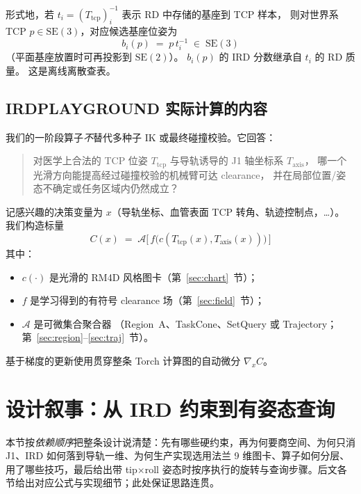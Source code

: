 \documentclass[UTF8,a4paper,11pt,fontset=fandol]{ctexart}
\newcommand{\SE}{\mathrm{SE}}
\newcommand{\Tcp}{T_{\mathrm{tcp}}}
\newcommand{\Taxis}{T_{\mathrm{axis}}}
\begin{document}
形式地，若 \(t_{i}=(\Tcp)_{i}^{-1}\) 表示 RD 中存储的基座到 TCP 样本，
则对世界系 TCP \(p\in\SE(3)\)，对应候选基座位姿为
\begin{equation}
\label{eq:ird-inversion}
  b_{i}(p) \;=\; p\, t_{i}^{-1}
  \;\in\;\SE(3)
\end{equation}
（平面基座放置时可再投影到 \(\SE(2)\)）。
\(b_{i}(p)\) 的 IRD 分数继承自 \(t_{i}\) 的 RD 质量。
这是离线离散查表。

\subsection{IRDPLAYGROUND 实际计算的内容}
\label{sec:our-question}

我们的一阶段算子\emph{不}替代多种子 IK 或最终碰撞校验。它回答：

\begin{quote}
对医学上合法的 TCP 位姿 \(\Tcp\) 与导轨诱导的 J1 轴坐标系 \(\Taxis\)，
哪一个光滑方向能提高经过碰撞校验的机械臂可达 clearance，
并在局部位置/姿态不确定或任务区域内仍然成立？
\end{quote}

记感兴趣的决策变量为 \(x\)（导轨坐标、血管表面 TCP 转角、轨迹控制点，\ldots）。
我们构造标量
\begin{equation}
\label{eq:operator-goal}
  C(x)
  \;=\;
  \mathcal{A}\bigl[\, f\bigl(c(\Tcp(x),\Taxis(x))\bigr)\,\bigr]
\end{equation}
其中：
\begin{itemize}[leftmargin=1.4em]
  \item \(c(\cdot)\) 是光滑的 RM4D 风格图卡（第~\ref{sec:chart}~节）；
  \item \(f\) 是学习得到的有符号 clearance 场（第~\ref{sec:field}~节）；
  \item \(\mathcal{A}\) 是可微集合聚合器
        （Region~A、TaskCone、SetQuery 或 Trajectory；
        第~\ref{sec:region}--\ref{sec:traj}~节）。
\end{itemize}
基于梯度的更新使用贯穿整条 Torch 计算图的自动微分 \(\nabla_{x} C\)。

\section{设计叙事：从 IRD 约束到有姿态查询}
\label{sec:narrative}

本节按\emph{依赖顺序}把整条设计说清楚：先有哪些硬约束，再为何要商空间、为何只消 J1、IRD 如何落到导轨一维、为何生产实现选用法兰 9 维图卡、算子如何分层、用了哪些技巧，最后给出带 tip$\times$roll 姿态时按序执行的旋转与查询步骤。后文各节给出对应公式与实现细节；此处保证思路连贯。
\end{document}
